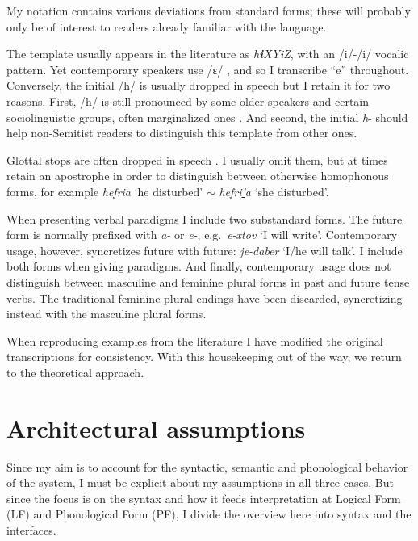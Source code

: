 My notation contains various deviations from standard forms; these will probably only be of interest to readers already familiar with the language.

The template {\thif} usually appears in the literature as \emph{h\textbf{i}XYiZ}, with an /i/-/i/ vocalic pattern. Yet contemporary speakers use /ɛ/ \citep{trachtman16}, and so I transcribe ``e'' throughout. Conversely, the initial /h/ is usually dropped in speech but I retain it for two reasons. First, /h/ is still pronounced by some older speakers and certain sociolinguistic groups, often marginalized ones \citep[cf.~][]{schwarzwald81biu,gafter14phd}. And second, the initial \emph{h}- should help non-Semitist readers to distinguish this template from other ones.

Glottal stops are often dropped in speech \citep{enguehardfaust18}. I usually omit them, but at times retain an apostrophe in order to distinguish between otherwise homophonous forms, for example \emph{hefria} `he disturbed' $\sim$ \emph{hefri\underline{'}a} `she disturbed'.

When presenting verbal paradigms I include two substandard forms. The  future form is normally prefixed with \emph{a-} or \emph{e-}, e.g.~\emph{e-xtov} `I will write'. Contemporary usage, however, syncretizes  future with  future: \emph{je-daber} `I/he will talk'. I include both forms when giving paradigms. And finally, contemporary usage does not distinguish between masculine and feminine plural forms in past and future tense verbs. The traditional feminine plural endings have been discarded, syncretizing instead with the masculine plural forms.

When reproducing examples from the literature I have modified the original transcriptions for consistency. With this housekeeping out of the way, we return to the theoretical approach.


\section{Architectural assumptions} \label{intro:arch}
Since my aim is to account for the syntactic, semantic and phonological behavior of the system, I must be explicit about my assumptions in all three cases. But since the focus is on the syntax and how it feeds interpretation at Logical Form (LF) and Phonological Form (PF), I divide the overview here into syntax and the interfaces.

